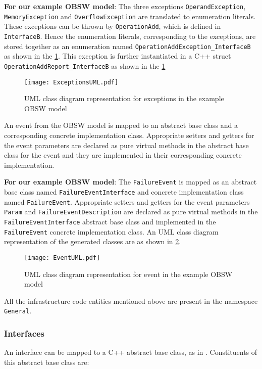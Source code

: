 \textbf{For our example OBSW model}: The three exceptions \texttt{Operand\allowbreak Exception}, \texttt{Memory\allowbreak Exception} and \texttt{Overflow\allowbreak Exception} are translated to enumeration literals. These exceptions can be thrown by \texttt{OperationAdd}, which is defined in \texttt{InterfaceB}. Hence the enumeration literals, corresponding to the exceptions, are stored together as an enumeration named \texttt{OperationAdd\allowbreak Exception\allowbreak\_InterfaceB} as shown in the \cref{fig: ExceptionsUML}. This exception is further instantiated in a C++ struct \texttt{OperationAdd\allowbreak Report\allowbreak\_InterfaceB} as shown in the \cref{fig: ExceptionsUML} 

\begin{figure}[h]
	\centering
	\texttt{[image: ExceptionsUML.pdf]}
	\caption{UML class diagram representation for exceptions in the example OBSW model}
	\label{fig: ExceptionsUML}
\end{figure}

An event from the OBSW model is mapped to an abstract base class and a corresponding concrete implementation class. Appropriate setters and getters for the event parameters are declared as pure virtual methods in the abstract base class for the event and they are implemented in their corresponding concrete implementation.

\textbf{For our example OBSW model}: The \texttt{FailureEvent} is mapped as an abstract base class named \texttt{FailureEvent\allowbreak Interface} and concrete implementation class named \texttt{FailureEvent}. Appropriate setters and getters for the event parameters \texttt{Param} and \texttt{Failure\allowbreak Event\allowbreak	Description} are declared as pure virtual methods in the \texttt{FailureEvent\allowbreak Interface} abstract base class and implemented in the \texttt{FailureEvent} concrete implementation class. An UML class diagram representation of the generated classes are as shown in \cref{fig: EventUML}.

\begin{figure}[h]
	\centering
	\texttt{[image: EventUML.pdf]}
	\caption{UML class diagram representation for event in the example OBSW model}
	\label{fig: EventUML}
\end{figure}    

All the infrastructure code entities mentioned above are present in the namespace \texttt{General}.  

\subsubsection{\textbf{Interfaces}}
An interface can be mapped to a C++ abstract base class, as in \cite{EvoRAVCodeAr}. Constituents of this abstract base class are:

